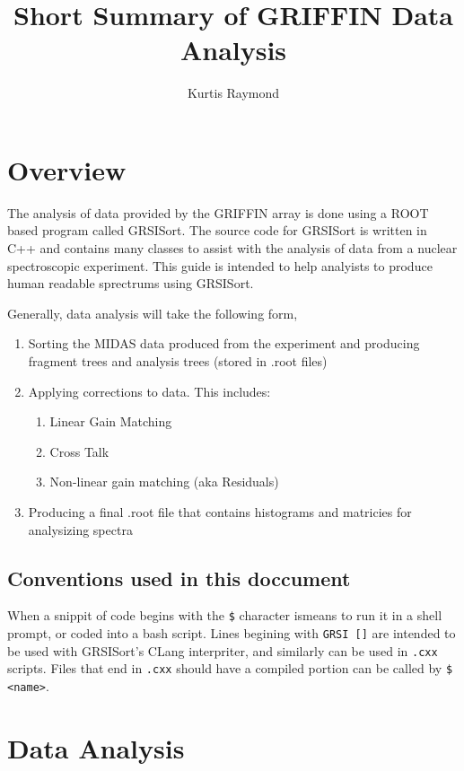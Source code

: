 \documentclass[10pt]{article} %
\title{Short Summary of GRIFFIN Data Analysis}
\author{Kurtis Raymond}
\date{} %
\begin{document}
\maketitle

\section{Overview}

The analysis of data provided by the GRIFFIN array is done using a ROOT based program called GRSISort.
The source code for GRSISort is written in C++ and contains many classes to assist with the analysis of data from a nuclear spectroscopic experiment.
This guide is intended to help analyists to produce human readable sprectrums using GRSISort.

Generally, data analysis will take the following form,
\begin{enumerate}
\item
Sorting the MIDAS data produced from the experiment and producing fragment trees and analysis trees (stored in .root files)
\item
Applying corrections to data.
This includes:
\begin{enumerate}
\item
Linear Gain Matching
\item
Cross Talk
\item
Non-linear gain matching (aka Residuals)
\end{enumerate}
\item
Producing a final .root file that contains histograms and matricies for analysizing spectra
\end{enumerate}

\subsection{Conventions used in this doccument}

When a snippit of code begins with the \texttt{\$} character ismeans to run it in a shell prompt, or coded into a bash script. Lines begining with \texttt{GRSI []} are intended to be used with GRSISort's CLang interpriter, and similarly can be used in \texttt{.cxx} scripts.
Files that end in \texttt{.cxx} should have a compiled portion can be called by \texttt{\$ <name>}.

\section{Data Analysis}
\end{document}
